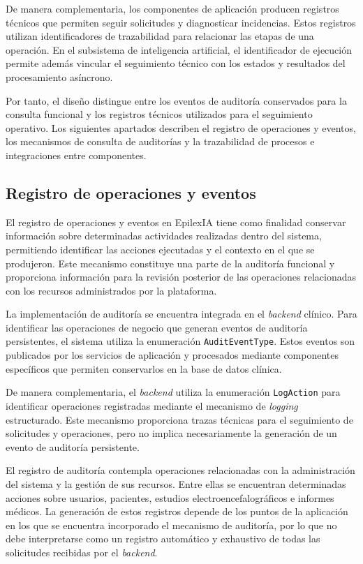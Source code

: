 De manera complementaria, los componentes de aplicación producen registros técnicos que permiten seguir solicitudes y diagnosticar incidencias. Estos registros utilizan identificadores de trazabilidad para relacionar las etapas de una operación. En el subsistema de inteligencia artificial, el identificador de ejecución permite además vincular el seguimiento técnico con los estados y resultados del procesamiento asíncrono.

Por tanto, el diseño distingue entre los eventos de auditoría conservados para la consulta funcional y los registros técnicos utilizados para el seguimiento operativo. Los siguientes apartados describen el registro de operaciones y eventos, los mecanismos de consulta de auditorías y la trazabilidad de procesos e integraciones entre componentes.


\subsection{Registro de operaciones y eventos}
\label{subsec:registro-operaciones-eventos}

El registro de operaciones y eventos en EpilexIA tiene como finalidad conservar información sobre determinadas actividades realizadas dentro del sistema, permitiendo identificar las acciones ejecutadas y el contexto en el que se produjeron. Este mecanismo constituye una parte de la auditoría funcional y proporciona información para la revisión posterior de las operaciones relacionadas con los recursos administrados por la plataforma.

La implementación de auditoría se encuentra integrada en el \textit{backend}
clínico. Para identificar las operaciones de negocio que generan
eventos de auditoría persistentes, el sistema utiliza la enumeración
\texttt{AuditEventType}. Estos eventos son publicados por los servicios
de aplicación y procesados mediante componentes específicos que
permiten conservarlos en la base de datos clínica.

De manera complementaria, el \textit{backend} utiliza la enumeración
\texttt{LogAction} para identificar operaciones registradas mediante
el mecanismo de \textit{logging} estructurado. Este mecanismo proporciona
trazas técnicas para el seguimiento de solicitudes y operaciones,
pero no implica necesariamente la generación de un evento de
auditoría persistente.

El registro de auditoría contempla operaciones relacionadas con la administración del sistema y la gestión de sus recursos. Entre ellas se encuentran determinadas acciones sobre usuarios, pacientes, estudios electroencefalográficos e informes médicos. La generación de estos registros depende de los puntos de la aplicación en los que se encuentra incorporado el mecanismo de auditoría, por lo que no debe interpretarse como un registro automático y exhaustivo de todas las solicitudes recibidas por el \textit{backend}.

